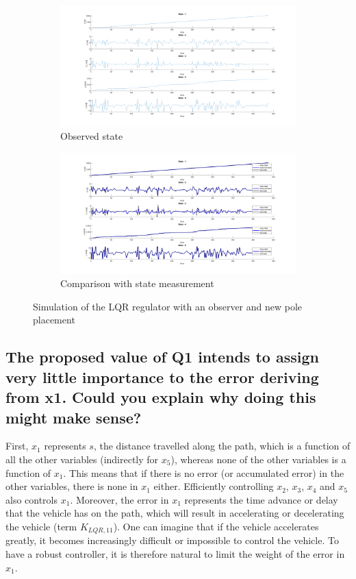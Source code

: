 \begin{figure}[H]
\begin{subfigure}[b]{0.8\textwidth}
         \centering
         \includegraphics[width=\textwidth]{Latex report/image/ex2/state.png}
         \caption{Observed state}
         \label{fig:State}
     \end{subfigure}
     \begin{subfigure}[b]{0.8\textwidth}
         \centering
         \includegraphics[width=\textwidth]{Latex report/image/ex2/obs.png}
         \caption{Comparison with state measurement}
         \label{fig:Obs}
     \end{subfigure}
    \caption{Simulation of the LQR regulator with an observer and new pole placement}
    \label{fig:sim}
\end{figure}

\subsection{The proposed value of Q1 intends to assign very little importance to the error deriving from x1. Could you explain why doing this might make sense?}

First, $x_1$ represents $s$, the distance travelled along the path, which is a function of all the other variables (indirectly for $x_5$), whereas none of the other variables is a function of $x_1$. This means that if there is no error (or accumulated error) in the other variables, there is none in $x_1$ either. Efficiently controlling $x_2$, $x_3$, $x_4$ and $x_5$ also controls $x_1$. Moreover, the error in $x_1$ represents the time advance or delay that the vehicle has on the path, which will result in accelerating or decelerating the vehicle (term $K_{LQR,11}$). One can imagine that if the vehicle accelerates greatly, it becomes increasingly difficult or impossible to control the vehicle. To have a robust controller, it is therefore natural to limit the weight of the error in $x_1$.



